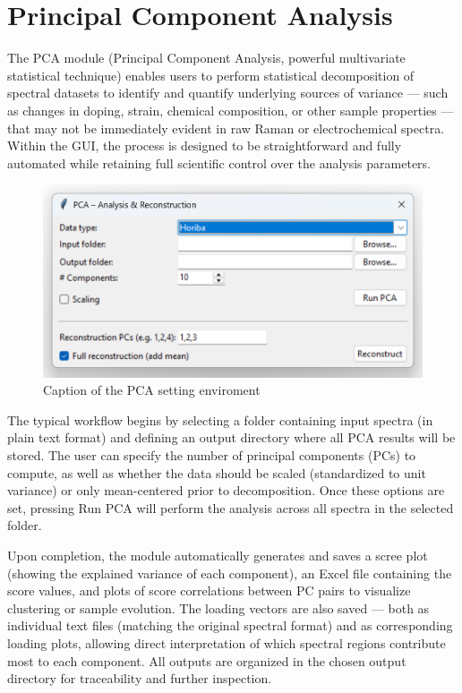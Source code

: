 \section{Principal Component Analysis}

The PCA module (Principal Component Analysis, powerful multivariate statistical technique) enables users to perform statistical decomposition of spectral datasets to identify and quantify underlying sources of variance — such as changes in doping, strain, chemical composition, or other sample properties — that may not be immediately evident in raw Raman or electrochemical spectra. Within the GUI, the process is designed to be straightforward and fully automated while retaining full scientific control over the analysis parameters.

\begin{figure}[H]
    \centering
    \includegraphics[width=0.75\linewidth]{Resources/PCA_env.png}
    \caption{Caption of the PCA setting enviroment}
    \label{PCA_env}
\end{figure}

The typical workflow begins by selecting a folder containing input spectra (in plain text format) and defining an output directory where all PCA results will be stored. The user can specify the number of principal components (PCs) to compute, as well as whether the data should be scaled (standardized to unit variance) or only mean-centered prior to decomposition. Once these options are set, pressing Run PCA will perform the analysis across all spectra in the selected folder.

Upon completion, the module automatically generates and saves a scree plot (showing the explained variance of each component), an Excel file containing the score values, and plots of score correlations between PC pairs to visualize clustering or sample evolution. The loading vectors are also saved — both as individual text files (matching the original spectral format) and as corresponding loading plots, allowing direct interpretation of which spectral regions contribute most to each component. All outputs are organized in the chosen output directory for traceability and further inspection.

